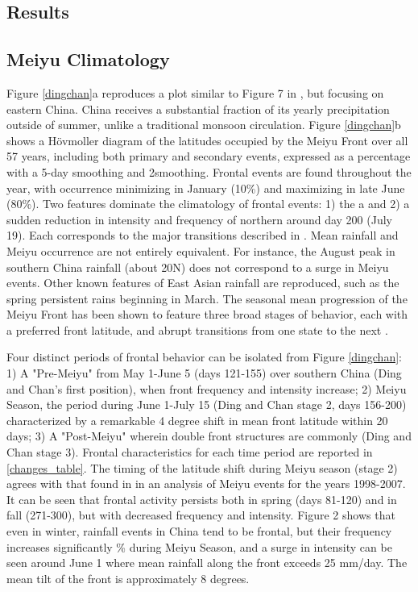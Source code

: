 \documentclass[draft,grl]{AGUTeX}
\begin{document}
\begin{article}
\section{Results}	
	
\subsection{Meiyu Climatology}	

	Figure \ref{dingchan}a reproduces a plot similar to Figure 7 in \citet{Ding2005}, but focusing on eastern China. China receives a substantial fraction of its yearly precipitation outside of summer, unlike a traditional monsoon circulation. Figure \ref{dingchan}b shows a H\"ovmoller diagram of the latitudes occupied by the Meiyu Front over all 57 years, including both primary and secondary events, expressed as a percentage with a 5-day smoothing and 2\textdegree smoothing. Frontal events are found throughout the year, with occurrence minimizing in January (10\%) and maximizing in late June (80\%). Two features dominate the climatology of frontal events: 1) the a and 2) a sudden reduction in intensity and frequency of northern around day 200 (July 19). Each corresponds to the major transitions described in \citet{Ding2005}. Mean rainfall and Meiyu occurrence are not entirely equivalent. For instance, the August peak in southern China rainfall (about 20\textdegree N) does not correspond to a surge in Meiyu events. Other known features of East Asian rainfall are reproduced, such as the spring persistent rains beginning in March. The seasonal mean progression of the Meiyu Front has been shown to feature three broad stages of behavior, each with a preferred front latitude, and abrupt transitions from one state to the next \citep{Ding2005}.
	
	Four distinct periods of frontal behavior can be isolated from Figure \ref{dingchan}: 1) A "Pre-Meiyu" from May 1-June 5 (days 121-155) over southern China (Ding and Chan's first position), when front frequency and intensity increase; 2) Meiyu Season, the period during June 1-July 15 (Ding and Chan stage 2, days 156-200) characterized by a remarkable 4 degree shift in mean front latitude within 20 days; 3) A "Post-Meiyu" wherein double front structures are commonly (Ding and Chan stage 3). Frontal characteristics for each time period are reported in \ref{changes_table}. The timing of the latitude shift during Meiyu season (stage 2) agrees with that found in \citet{Xu2009} in an analysis of Meiyu events for the years 1998-2007. It can be seen that frontal activity persists both in spring (days 81-120) and in fall (271-300), but with decreased frequency and intensity. Figure 2 shows that even in winter, rainfall events in China tend to be frontal, but their frequency increases significantly \% during Meiyu Season, and a surge in intensity can be seen around June 1 where mean rainfall along the front exceeds 25 mm/day. The mean tilt of the front is approximately 8 degrees.
	

\end{article}
\end{document}
